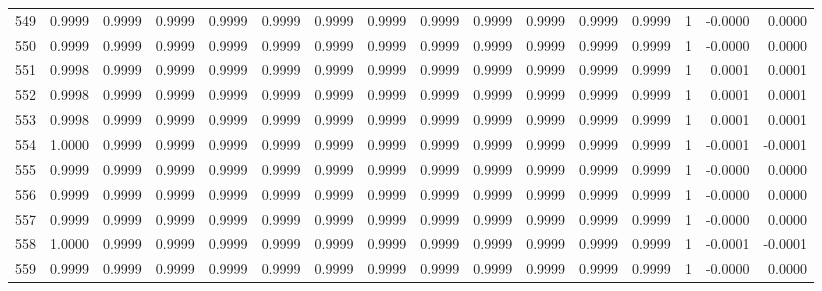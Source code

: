 \begin{tabular}{lrrrrrrrrrrrrrrr}
549 &      0.9999 &  0.9999 &  0.9999 &  0.9999 &  0.9999 &  0.9999 &  0.9999 &  0.9999 &  0.9999 &  0.9999 &   0.9999 &     0.9999 &      1 &                   -0.0000 &                     0.0000 \\
550 &      0.9999 &  0.9999 &  0.9999 &  0.9999 &  0.9999 &  0.9999 &  0.9999 &  0.9999 &  0.9999 &  0.9999 &   0.9999 &     0.9999 &      1 &                   -0.0000 &                     0.0000 \\
551 &      0.9998 &  0.9999 &  0.9999 &  0.9999 &  0.9999 &  0.9999 &  0.9999 &  0.9999 &  0.9999 &  0.9999 &   0.9999 &     0.9999 &      1 &                    0.0001 &                     0.0001 \\
552 &      0.9998 &  0.9999 &  0.9999 &  0.9999 &  0.9999 &  0.9999 &  0.9999 &  0.9999 &  0.9999 &  0.9999 &   0.9999 &     0.9999 &      1 &                    0.0001 &                     0.0001 \\
553 &      0.9998 &  0.9999 &  0.9999 &  0.9999 &  0.9999 &  0.9999 &  0.9999 &  0.9999 &  0.9999 &  0.9999 &   0.9999 &     0.9999 &      1 &                    0.0001 &                     0.0001 \\
554 &      1.0000 &  0.9999 &  0.9999 &  0.9999 &  0.9999 &  0.9999 &  0.9999 &  0.9999 &  0.9999 &  0.9999 &   0.9999 &     0.9999 &      1 &                   -0.0001 &                    -0.0001 \\
555 &      0.9999 &  0.9999 &  0.9999 &  0.9999 &  0.9999 &  0.9999 &  0.9999 &  0.9999 &  0.9999 &  0.9999 &   0.9999 &     0.9999 &      1 &                   -0.0000 &                     0.0000 \\
556 &      0.9999 &  0.9999 &  0.9999 &  0.9999 &  0.9999 &  0.9999 &  0.9999 &  0.9999 &  0.9999 &  0.9999 &   0.9999 &     0.9999 &      1 &                   -0.0000 &                     0.0000 \\
557 &      0.9999 &  0.9999 &  0.9999 &  0.9999 &  0.9999 &  0.9999 &  0.9999 &  0.9999 &  0.9999 &  0.9999 &   0.9999 &     0.9999 &      1 &                   -0.0000 &                     0.0000 \\
558 &      1.0000 &  0.9999 &  0.9999 &  0.9999 &  0.9999 &  0.9999 &  0.9999 &  0.9999 &  0.9999 &  0.9999 &   0.9999 &     0.9999 &      1 &                   -0.0001 &                    -0.0001 \\
559 &      0.9999 &  0.9999 &  0.9999 &  0.9999 &  0.9999 &  0.9999 &  0.9999 &  0.9999 &  0.9999 &  0.9999 &   0.9999 &     0.9999 &      1 &                   -0.0000 &                     0.0000 \\

\end{tabular}
